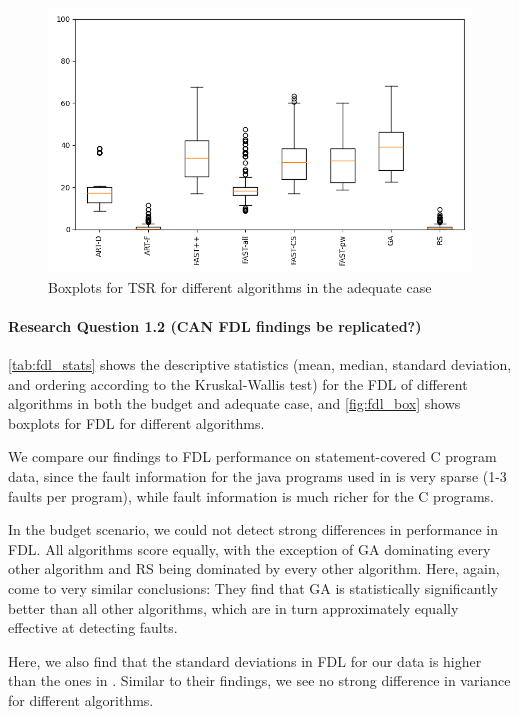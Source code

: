 \begin{figure}[h]
\caption[TSR boxplots, adequate]{Boxplots for TSR for different algorithms in the adequate case}\label{fig:tsr_box}
\centering
\includegraphics[scale=0.7]{figures/tsrs.png}
\end{figure}

\paragraph{Research Question 1.2 (CAN FDL findings be replicated?)}

\autoref{tab:fdl_stats} shows the descriptive statistics (mean, median,
standard deviation, and ordering according to the Kruskal-Wallis test)
for the FDL of different algorithms in both the budget and adequate case,
and \autoref{fig:fdl_box} shows boxplots for FDL for different algorithms.

We compare our findings to FDL performance on statement-covered C
program data, since the fault information for the java programs used
in \cite{cruciani2019scalable} is very sparse (1-3 faults per program),
while fault information is much richer for the C programs.

In the budget scenario, we could not detect strong differences in
performance in FDL. All algorithms score equally, with the exception
of GA dominating every other algorithm and RS being dominated by every
other algorithm. Here, again, \cite{cruciani2019scalable} come to very
similar conclusions: They find that GA is statistically significantly
better than all other algorithms, which are in turn approximately equally
effective at detecting faults.

Here, we also find that the standard deviations in FDL for our data
is higher than the ones in \cite{cruciani2019scalable}. Similar to
their findings, we see no strong difference in variance for different
algorithms.

